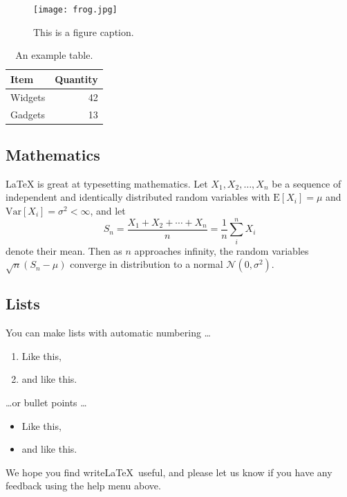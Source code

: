 \begin{figure}
\centering
\texttt{[image: frog.jpg]}
\caption{\label{fig:frog}This is a figure caption.}
\end{figure}

\begin{table}
\centering
\begin{tabular}{l|r}
Item & Quantity \\\hline
Widgets & 42 \\
Gadgets & 13
\end{tabular}
\caption{\label{tab:widgets}An example table.}
\end{table}

\subsection{Mathematics}

\LaTeX{} is great at typesetting mathematics. Let $X_1, X_2, \ldots, X_n$ be a sequence of independent and identically distributed random variables with $\text{E}[X_i] = \mu$ and $\text{Var}[X_i] = \sigma^2 < \infty$, and let
$$S_n = \frac{X_1 + X_2 + \cdots + X_n}{n}
      = \frac{1}{n}\sum_{i}^{n} X_i$$
denote their mean. Then as $n$ approaches infinity, the random variables $\sqrt{n}(S_n - \mu)$ converge in distribution to a normal $\mathcal{N}(0, \sigma^2)$.

\subsection{Lists}

You can make lists with automatic numbering \dots

\begin{enumerate}
\item Like this,
\item and like this.
\end{enumerate}
\dots or bullet points \dots
\begin{itemize}
\item Like this,
\item and like this.
\end{itemize}

We hope you find write\LaTeX\ useful, and please let us know if you have any feedback using the help menu above.

